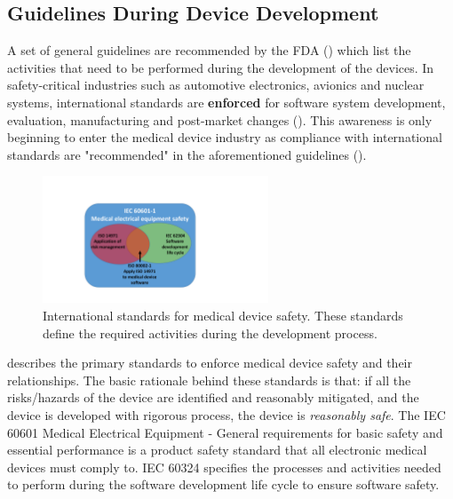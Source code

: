 \subsection{Guidelines During Device Development}
A set of general guidelines are recommended by the FDA (\cite{fda1, fda2, fda3}) which list the activities that need to be performed during the development of the devices. 
In safety-critical industries such as automotive electronics, avionics and nuclear systems, international standards are \textbf{enforced} for software system development, evaluation, manufacturing and post-market changes (\cite{autosar,avsi}). 
This awareness is only beginning to enter the medical device industry as compliance with international standards are "recommended" in the aforementioned guidelines (\cite{formal_fda}). 

\begin{figure}[t]
		\centering
		\includegraphics[width=0.6\textwidth]{figs/stardards.pdf}
		\caption{\small International standards for medical device safety. These standards define the required activities during the development process.}
		\label{fig:standards}
\end{figure}

 describes the primary standards to enforce medical device safety and their relationships. 
The basic rationale behind these standards is that: if all the risks/hazards of the device are identified and reasonably mitigated, and the device is developed with rigorous process, the device is \emph{reasonably safe}. 
The IEC 60601 Medical Electrical Equipment - General requirements for basic safety and essential performance is a product safety standard that all electronic medical devices must comply to. 
IEC 60324 specifies the processes and activities needed to perform during the software development life cycle to ensure software safety. 

